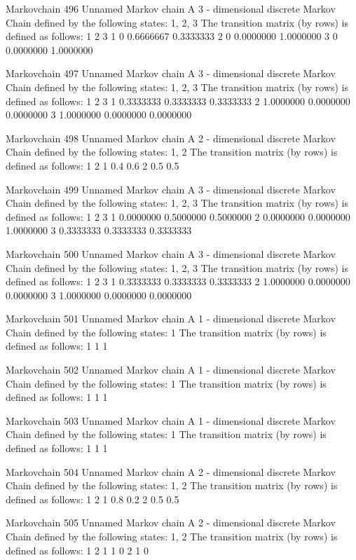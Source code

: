 \documentclass[
  nojss]{jss}
\begin{document}
\begin{CodeChunk}
\begin{CodeOutput}
Markovchain  496 
Unnamed Markov chain 
 A  3 - dimensional discrete Markov Chain defined by the following states: 
 1, 2, 3 
 The transition matrix  (by rows)  is defined as follows: 
  1         2         3
1 0 0.6666667 0.3333333
2 0 0.0000000 1.0000000
3 0 0.0000000 1.0000000

Markovchain  497 
Unnamed Markov chain 
 A  3 - dimensional discrete Markov Chain defined by the following states: 
 1, 2, 3 
 The transition matrix  (by rows)  is defined as follows: 
          1         2         3
1 0.3333333 0.3333333 0.3333333
2 1.0000000 0.0000000 0.0000000
3 1.0000000 0.0000000 0.0000000

Markovchain  498 
Unnamed Markov chain 
 A  2 - dimensional discrete Markov Chain defined by the following states: 
 1, 2 
 The transition matrix  (by rows)  is defined as follows: 
    1   2
1 0.4 0.6
2 0.5 0.5

Markovchain  499 
Unnamed Markov chain 
 A  3 - dimensional discrete Markov Chain defined by the following states: 
 1, 2, 3 
 The transition matrix  (by rows)  is defined as follows: 
          1         2         3
1 0.0000000 0.5000000 0.5000000
2 0.0000000 0.0000000 1.0000000
3 0.3333333 0.3333333 0.3333333

Markovchain  500 
Unnamed Markov chain 
 A  3 - dimensional discrete Markov Chain defined by the following states: 
 1, 2, 3 
 The transition matrix  (by rows)  is defined as follows: 
          1         2         3
1 0.3333333 0.3333333 0.3333333
2 1.0000000 0.0000000 0.0000000
3 1.0000000 0.0000000 0.0000000

Markovchain  501 
Unnamed Markov chain 
 A  1 - dimensional discrete Markov Chain defined by the following states: 
 1 
 The transition matrix  (by rows)  is defined as follows: 
  1
1 1

Markovchain  502 
Unnamed Markov chain 
 A  1 - dimensional discrete Markov Chain defined by the following states: 
 1 
 The transition matrix  (by rows)  is defined as follows: 
  1
1 1

Markovchain  503 
Unnamed Markov chain 
 A  1 - dimensional discrete Markov Chain defined by the following states: 
 1 
 The transition matrix  (by rows)  is defined as follows: 
  1
1 1

Markovchain  504 
Unnamed Markov chain 
 A  2 - dimensional discrete Markov Chain defined by the following states: 
 1, 2 
 The transition matrix  (by rows)  is defined as follows: 
    1   2
1 0.8 0.2
2 0.5 0.5

Markovchain  505 
Unnamed Markov chain 
 A  2 - dimensional discrete Markov Chain defined by the following states: 
 1, 2 
 The transition matrix  (by rows)  is defined as follows: 
  1 2
1 1 0
2 1 0


\end{CodeOutput}
\end{CodeChunk}
\end{document}

